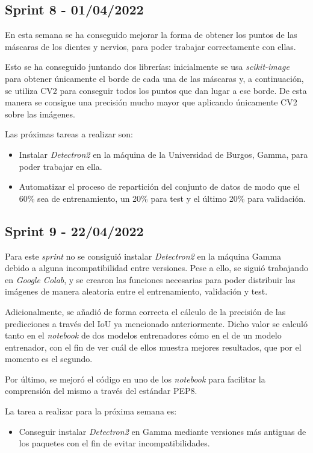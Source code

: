 \subsection{Sprint 8 - 01/04/2022}
En esta semana se ha conseguido mejorar la forma de obtener los puntos de las máscaras de los dientes y nervios, para poder trabajar correctamente con ellas. 

Esto se ha conseguido juntando dos librerías: inicialmente se usa \emph{scikit-image} para obtener únicamente el borde de cada una de las máscaras y, a continuación, se utiliza CV2 para conseguir todos los puntos que dan lugar a ese borde. De esta manera se consigue una precisión mucho mayor que aplicando únicamente CV2 sobre las imágenes.

Las próximas tareas a realizar son:
\begin{itemize}
    \item Instalar \emph{Detectron2} en la máquina de la Universidad de Burgos, Gamma, para poder trabajar en ella.
    \item Automatizar el proceso de repartición del conjunto de datos de modo que el 60\% sea de entrenamiento, un 20\% para test y el último 20\% para validación. 
\end{itemize}

\subsection{Sprint 9 - 22/04/2022}
Para este \emph{sprint} no se consiguió instalar \emph{Detectron2} en la máquina Gamma debido a alguna incompatibilidad entre versiones. Pese a ello, se siguió trabajando en \emph{Google Colab}, y se crearon las funciones necesarias para poder distribuir las imágenes de manera aleatoria entre el entrenamiento, validación y test. 

Adicionalmente, se añadió de forma correcta el cálculo de la precisión de las predicciones a través del IoU ya mencionado anteriormente. Dicho valor se calculó tanto en el \emph{notebook} de dos modelos entrenadores cómo en el de un modelo entrenador, con el fin de ver cuál de ellos muestra mejores resultados, que por el momento es el segundo.

Por último, se mejoró el código en uno de los \emph{notebook} para facilitar la comprensión del mismo a través del estándar PEP8.

La tarea a realizar para la próxima semana es:
\begin{itemize}
    \item Conseguir instalar \emph{Detectron2} en Gamma mediante versiones más antiguas de los paquetes con el fin de evitar incompatibilidades.
\end{itemize}

